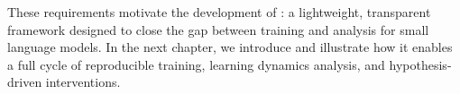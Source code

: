 These requirements motivate the development of \pico: a lightweight, transparent framework designed to close the gap between training and analysis for small language models. In the next chapter, we introduce \pico and illustrate how it enables a full cycle of reproducible training, learning dynamics analysis, and hypothesis-driven interventions.


